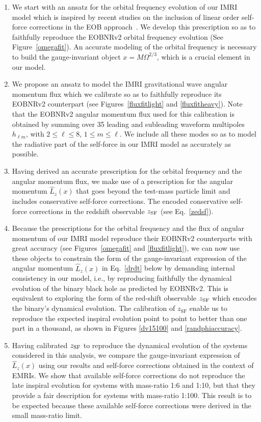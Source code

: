  \begin{enumerate}
 \item We start with an ansatz for the orbital frequency evolution of our IMRI model which is inspired by recent studies on the inclusion of linear order self-force corrections in the EOB approach~\cite{barus}. We develop this prescription so as to faithfully reproduce the EOBNRv2 orbital frequency evolution (See Figure~\ref{omegafit}).  An accurate modeling of the orbital frequency is necessary to build the gauge-invariant object \(x=M\Omega^{2/3}\), which is a crucial element in our model. 
%  
 \item We propose an ansatz to model the IMRI gravitational wave angular momentum flux which we calibrate so as to faithfully reproduce its EOBNRv2 counterpart (see Figures~\ref{fluxfitlight} and \ref{fluxfitheavy}). Note that the EOBNRv2 angular momentum flux used for this calibration  is obtained by summing over  35 leading and subleading waveform multipoles \(h_{\ell m}\), with  \(2\leq \ell \leq 8\), \(1\leq m\leq \ell\).  We include all these modes so as to model the radiative part of the self-force in our IMRI model as accurately as possible.
%  
 \item Having derived an accurate prescription for the orbital frequency and the angular momentum flux, we make use of a prescription for the angular momentum \(\hat{L}_z (x)\) that goes beyond the test-mass particle limit and includes conservative self-force corrections. The encoded conservative self-force corrections in the redshift observable \(z_{\rm SF}\) (see Eq.~\eqref{zedsf}). 
%  
 \item Because the prescriptions for the orbital frequency and the flux of angular momentum of our IMRI model reproduce their EOBNRv2 counterparts with great accuracy (see Figures~\ref{omegafit} and \ref{fluxfitlight}), we can now use these objects to constrain the form of the gauge-invariant expression of the angular momentum \(\hat{L}_z (x)\) in Eq.~\eqref{drdt} below by demanding internal consistency in our model, i.e., by reproducing faithfully the dynamical evolution of the binary black hole as predicted by EOBNRv2. This is equivalent to exploring the form of the red-shift observable \(z_{\rm SF}\) which encodes the binary's dynamical evolution. The calibration of $z_\mathrm{SF}$ enable us to reproduce the expected inspiral evolution point to point to better than one part in a thousand, as shown in Figures \ref{dv15100} and \ref{randphiaccuracy}.
 \item Having calibrated \(z_{\rm SF}\) to reproduce the dynamical evolution of the systems considered in this analysis, we compare the gauge-invariant expression of \(\hat{L}_z (x)\)  using our results and self-force corrections obtained in the context of EMRIs. We show that available self-force corrections do not reproduce the late inspiral evolution for systems with mass-ratio 1:6 and 1:10, but that they provide a fair description for systems with mass-ratio 1:100. This result is to be expected because these available self-force corrections were derived in the small mass-ratio limit.
 \end{enumerate}
 
